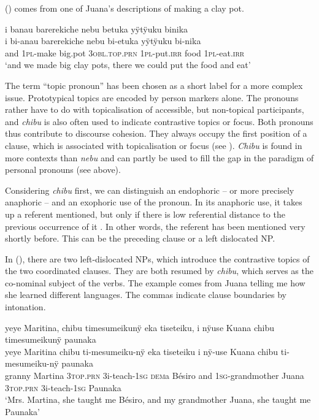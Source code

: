 () comes from one of Juana’s descriptions of making a clay pot.

\ea\label{ex:new23-top2}
\begingl
\glpreamble i banau barerekiche nebu betuka yÿtÿuku binika\\
\gla i bi-anau barerekiche nebu bi-etuka yÿtÿuku bi-nika\\
\glb and 1\textsc{pl}-make big.pot 3\textsc{obl.top.prn} 1\textsc{pl}-put.\textsc{irr} food 1\textsc{pl}-eat.\textsc{irr}\\
\glft ‘and we made big clay pots, there we could put the food and eat’
\endgl
\trailingcitation{[jxx-d110923l-2.42]}
\xe


The term “topic pronoun”  has been chosen as a short label for a more complex issue. Prototypical topics are encoded by person markers alone. The pronouns rather have to do with topicalisation of accessible, but non-topical participants, and \textit{chibu} is also often used to indicate contrastive topics or focus. Both pronouns thus contribute to discourse cohesion. They always occupy the first position of a clause, which is associated with topicalisation or focus (see ). \textit{Chibu} is found in more contexts than \textit{nebu} and can partly be used to fill the gap in the paradigm of personal pronouns (see  above).

Considering \textit{chibu} first, we can distinguish an endophoric – or more precisely ana\-phoric – and an exophoric use of the pronoun. In its anaphoric use, it takes up a referent mentioned, but only if there is low referential distance to the previous occurrence of it \citep[cf.][13]{Givon1985}. In other words, the referent has been mentioned very shortly before. This can be the preceding clause or a left dislocated NP. 

In (), there are two left-dislocated NPs, which introduce the contrastive topics of the two coordinated clauses. They are both resumed by \textit{chibu}, which serves as the co-nominal subject of the verbs. The example comes from Juana telling me how she learned different languages. The commas indicate clause boundaries by intonation.

\ea\label{ex:chibu-1}
\begingl
\glpreamble yeye Maritina, chibu timesumeikunÿ eka tiseteiku, i nÿuse Kuana chibu\\ timesumeikunÿ paunaka\\
\gla yeye Maritina chibu ti-mesumeiku-nÿ eka tiseteiku i nÿ-use Kuana chibu ti-mesumeiku-nÿ paunaka\\
\glb granny Martina 3\textsc{top.prn} 3i-teach-1\textsc{sg} \textsc{dem}a Bésiro and 1\textsc{sg}-grandmother Juana 3\textsc{top.prn} 3i-teach-1\textsc{sg} Paunaka\\
\glft ‘Mrs. Martina, she taught me Bésiro, and my grandmother Juana, she taught me Paunaka’
\endgl
\trailingcitation{[jxx-p120430l-1.044-048]}
\xe

